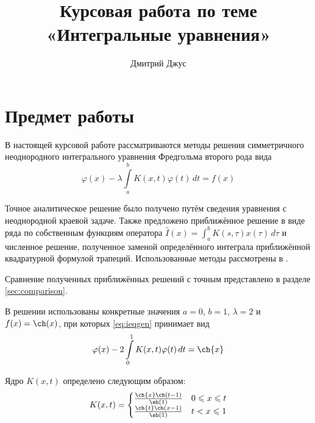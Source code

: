 \documentclass{article}
\numberwithin{equation}{section}
\renewcommand{\phi}{\varphi}
\renewcommand{\leq}{\leqslant}
\newcommand{\intl}{\int\limits}
\begin{document}
\author{Дмитрий Джус}
\title{Курсовая работа по теме \\
  \Huge{«Интегральные уравнения»}}
\pretitle{\begin{center}\LARGE}
\posttitle{\par\end{center}\vskip 3pc}
\date{}
\maketitle
\thispagestyle{empty}

\clearpage
\tableofcontents

\clearpage
\section{Предмет работы}
\label{sec:problem}
В настоящей курсовой работе рассматриваются методы решения
симметричного неоднородного интегрального уравнения Фредгольма второго
рода вида
\begin{equation}
  \label{eq:ieqgen}
  \phi(x) - \lambda \intl_a^b {K(x, t) \phi(t)\,dt} = f(x)
\end{equation}

Точное аналитическое решение было получено путём сведения уравнения с
неоднородной краевой задаче. Также предложено приближённое решение в
виде ряда по собственным функциям оператора $\hat{I}(x) =
\int_a^b{K(s, \tau) x(\tau)\, d\tau}$ и численное решение, полученное
заменой определённого интеграла приближённой квадратурной формулой
трапеций. Использованные методы рассмотрены в \cite{polyanin03}.

Сравнение полученных приближённых решений с точным представлено в
разделе \ref{sec:comparison}.

В решении использованы конкретные значения $a=0$, $b=1$, $\lambda = 2$
и $f(x) = \ch(x)$, при которых \eqref{eq:ieqgen} принимает вид
\begin{equation}
  \label{eq:ieq}
  \phi(x) - 2 \intl_0^1 {K(x, t) \phi(t)\,dt} = \ch{x}
\end{equation}

Ядро $K(x,t)$ определено следующим образом:
\begin{equation}
  \label{eq:kernel}
  K(x, t) = 
  \begin{cases}
    \frac{\ch{x} \ch(t-1)}{\sh(1)} & 0 \leq x \leq t\\
    \frac{\ch{t} \ch(x-1)}{\sh(1)} & t < x \leq 1
  \end{cases}
\end{equation}
\end{document}
